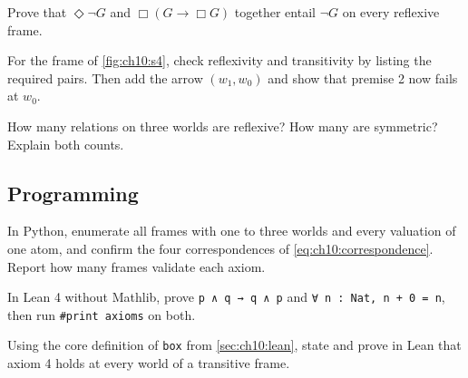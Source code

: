 \begin{exercise}\label{exr:ch10:reverse}
Prove that $\Diamond\neg G$ and $\Box(G\to\Box G)$ together entail $\neg G$ on every reflexive frame.
\end{exercise}

\begin{exercise}\label{exr:ch10:s4}
For the frame of \cref{fig:ch10:s4}, check reflexivity and transitivity by listing the required pairs. Then add the arrow $(w_1,w_0)$ and show that premise 2 now fails at $w_0$.
\end{exercise}

\begin{exercise}\label{exr:ch10:count}
How many relations on three worlds are reflexive? How many are symmetric? Explain both counts.
\end{exercise}

\subsection*{Programming}

\begin{exercise}\label{exr:ch10:brute}
In Python, enumerate all frames with one to three worlds and every valuation of one atom, and confirm the four correspondences of \eqref{eq:ch10:correspondence}. Report how many frames validate each axiom.
\end{exercise}

\begin{exercise}\label{exr:ch10:leanbasic}
In Lean 4 without Mathlib, prove \texttt{p ∧ q → q ∧ p} and \texttt{∀ n : Nat, n + 0 = n}, then run \texttt{\#print axioms} on both.
\end{exercise}

\begin{exercise}\label{exr:ch10:leanfour}
Using the core definition of \texttt{box} from \cref{sec:ch10:lean}, state and prove in Lean that axiom 4 holds at every world of a transitive frame.
\end{exercise}

\makeatletter\let\sectionmark\omp@savedsectionmark\makeatother

